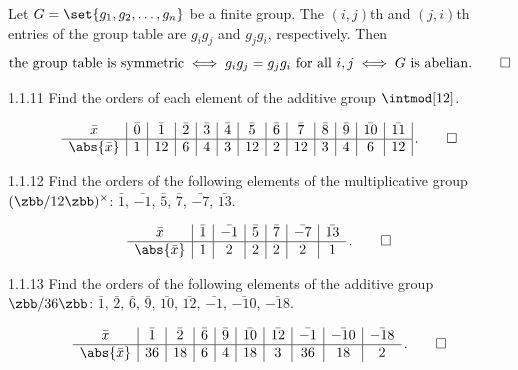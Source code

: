 \begin{sol}
    Let $G = \set{g_1, g_2, \ldots, g_n}$ be a finite group.
    The $(i,j)$th and $(j,i)$th entries of the group table are $g_i g_j$ and $g_j g_i$, respectively.
    Then
    \[
        \text{the group table is symmetric} \iff g_i g_j = g_j g_i \text{ for all } i, j \iff G \text{ is abelian}. \qedhere
    \]
\end{sol}

\begin{exercise}{1.1.11}
    Find the orders of each element of the additive group $\intmod[12]$.
\end{exercise}

\begin{sol}
    \[
        \begin{array}{*{13}{c|}}
            \bar x & \bar 0 & \bar 1 & \bar 2 & \bar 3 & \bar 4 & \bar 5 & \bar 6 & \bar 7 & \bar 8 & \bar 9 & \bar{10} & \bar{11} \\
            \hline
            \abs{\bar x} & 1 & 12 & 6 & 4 & 3 & 12 & 2 & 12 & 3 & 4 & 6 & 12
        \end{array}\,. \qedhere
	\]
\end{sol}

\begin{exercise}{1.1.12}
    Find the orders of the following elements of the multiplicative group $(\zbb/12\zbb)^{\times}$: $\bar{1}$, $\bar{-1}$, $\bar{5}$, $\bar{7}$, $\bar{-7}$, $\bar{13}$.
\end{exercise}

\begin{sol}
    \[
    	\begin{array}{*{6}{c|}c}
            \bar x & \bar{1} & \bar{-1} & \bar{5} & \bar{7} & \bar{-7} & \bar{13} \\
            \hline
            \abs{\bar x} & 1 & 2 & 2 & 2 & 2 & 1
        \end{array}\,. \qedhere
	\]
\end{sol}

\begin{exercise}{1.1.13}
    Find the orders of the following elements of the additive group $\zbb/36\zbb$: $\bar{1}$, $\bar{2}$, $\bar{6}$, $\bar{9}$, $\bar{10}$, $\bar{12}$, $\bar{-1}$, $\bar{-10}$, $\bar{-18}$.
\end{exercise}

\begin{sol}
    \[
    	\begin{array}{*{9}{c|}c}
            \bar x & \bar 1 & \bar 2 & \bar 6 & \bar 9 & \bar{10} & \bar{12} & \bar{-1} & \bar{-10} & \bar{-18} \\
            \hline
            \abs{\bar x} & 36 & 18 & 6 & 4 & 18 & 3 & 36 & 18 & 2
        \end{array}\,. \qedhere
	\]
\end{sol}

